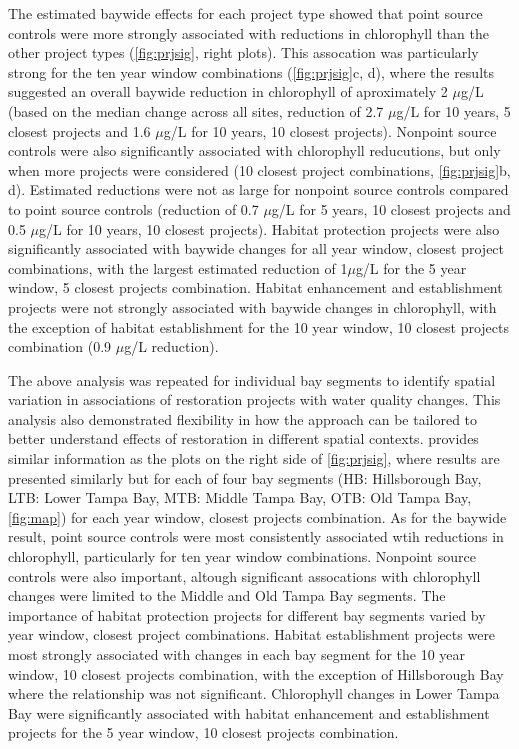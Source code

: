 \documentclass[]{article}
\begin{document}
The estimated baywide effects for each project type showed that point
source controls were more strongly associated with reductions in
chlorophyll than the other project types (\cref{fig:prjsig}, right
plots). This assocation was particularly strong for the ten year window
combinations (\cref{fig:prjsig}c, d), where the results suggested an
overall baywide reduction in chlorophyll of aproximately 2 \(\mu\)g/L
(based on the median change across all sites, reduction of 2.7
\(\mu\)g/L for 10 years, 5 closest projects and 1.6 \(\mu\)g/L for 10
years, 10 closest projects). Nonpoint source controls were also
significantly associated with chlorophyll reducutions, but only when
more projects were considered (10 closest project combinations,
\cref{fig:prjsig}b, d). Estimated reductions were not as large for
nonpoint source controls compared to point source controls (reduction of
0.7 \(\mu\)g/L for 5 years, 10 closest projects and 0.5 \(\mu\)g/L for
10 years, 10 closest projects). Habitat protection projects were also
significantly associated with baywide changes for all year window,
closest project combinations, with the largest estimated reduction of
1\(\mu\)g/L for the 5 year window, 5 closest projects combination.
Habitat enhancement and establishment projects were not strongly
associated with baywide changes in chlorophyll, with the exception of
habitat establishment for the 10 year window, 10 closest projects
combination (0.9 \(\mu\)g/L reduction).

The above analysis was repeated for individual bay segments to identify
spatial variation in associations of restoration projects with water
quality changes. This analysis also demonstrated flexibility in how the
approach can be tailored to better understand effects of restoration in
different spatial contexts.  provides similar
information as the plots on the right side of \cref{fig:prjsig}, where
results are presented similarly but for each of four bay segments (HB:
Hillsborough Bay, LTB: Lower Tampa Bay, MTB: Middle Tampa Bay, OTB: Old
Tampa Bay, \cref{fig:map}) for each year window, closest projects
combination. As for the baywide result, point source controls were most
consistently associated wtih reductions in chlorophyll, particularly for
ten year window combinations. Nonpoint source controls were also
important, altough significant assocations with chlorophyll changes were
limited to the Middle and Old Tampa Bay segments. The importance of
habitat protection projects for different bay segments varied by year
window, closest project combinations. Habitat establishment projects
were most strongly associated with changes in each bay segment for the
10 year window, 10 closest projects combination, with the exception of
Hillsborough Bay where the relationship was not significant. Chlorophyll
changes in Lower Tampa Bay were significantly associated with habitat
enhancement and establishment projects for the 5 year window, 10 closest
projects combination.
\end{document}
